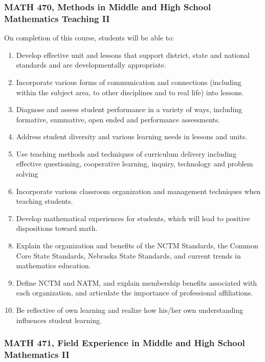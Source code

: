 \documentclass[11pt]{article}
\newenvironment{alphalist}{
\begin{enumerate}[label=(\arabic*),widest=107 ,leftmargin=25pt, itemsep=0pt]}
{\end{enumerate}}
\begin{document}
\subsubsection*{MATH 470, Methods in Middle and High School Mathematics Teaching II}

On completion of this course, students will be able to:
\begin{alphalist}
\item Develop effective unit and lessons that support district, state and national standards and are developmentally appropriate.
\item Incorporate various forms of communication and connections (including within the subject area, to other disciplines and to real life) into lessons.
\item Diagnose and assess student performance in a variety of ways, including formative, summative, open ended and performance assessments.
\item Address student diversity and various learning needs in lessons and units.
\item Use teaching methods and techniques of curriculum delivery including effective questioning, cooperative learning, inquiry, technology and problem solving
\item Incorporate various classroom organization and management techniques when teaching students.
\item Develop mathematical experiences for students, which will lead to positive dispositions toward math.
 \item Explain the organization and benefits of the NCTM Standards, the Common Core State Standards, Nebraska State Standards, and current trends in mathematics education.
\item Define NCTM and NATM, and explain membership benefits associated with each organization, and articulate the importance of professional affiliations.
\item Be reflective of own learning and realize how his/her own understanding influences student learning.
\end{alphalist}

\subsubsection*{MATH 471, Field Experience in Middle and High School Mathematics II}
\end{document}
